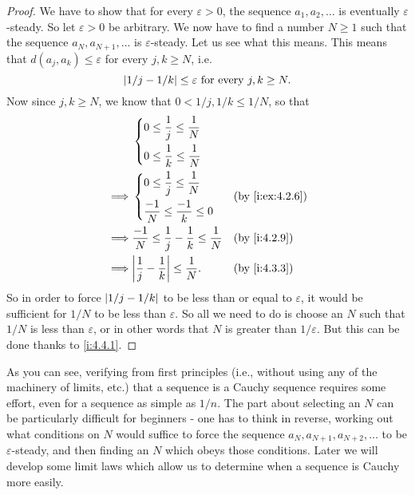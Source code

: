 \begin{proof}
  We have to show that for every \(\varepsilon > 0\), the sequence \(a_1, a_2, \dots\) is eventually \(\varepsilon\)-steady.
  So let \(\varepsilon > 0\) be arbitrary.
  We now have to find a number \(N \geq 1\) such that the sequence \(a_N, a_{N + 1}, \dots\) is \(\varepsilon\)-steady.
  Let us see what this means.
  This means that \(d(a_j, a_k) \leq \varepsilon\) for every \(j, k \geq N\), i.e.
  \[
    \left\lvert1 / j - 1 / k\right\rvert \leq \varepsilon \text{ for every } j, k \geq N.
  \]
  Now since \(j, k \geq N\), we know that \(0 < 1 / j, 1 / k \leq 1 / N\), so that
  \begin{align*}
             &
    \begin{dcases}
      0 \leq \dfrac{1}{j} \leq \dfrac{1}{N} \\
      0 \leq \dfrac{1}{k} \leq \dfrac{1}{N} \\
    \end{dcases}
    \\
    \implies &
    \begin{dcases}
      0 \leq \dfrac{1}{j} \leq \dfrac{1}{N}   \\
      \dfrac{-1}{N} \leq \dfrac{-1}{k} \leq 0 \\
    \end{dcases}
             &                                                                  & \by{i:ex:4.2.6}                \\
    \implies & \dfrac{-1}{N} \leq \dfrac{1}{j} - \dfrac{1}{k} \leq \dfrac{1}{N} &                 & \by{i:4.2.9} \\
    \implies & \abs{\dfrac{1}{j} - \dfrac{1}{k}} \leq \dfrac{1}{N}.             &                 & \by{i:4.3.3}
  \end{align*}
  So in order to force \(\left\lvert1 / j - 1 / k\right\rvert\) to be less than or equal to \(\varepsilon\), it would be sufficient for \(1 / N\) to be less than \(\varepsilon\).
  So all we need to do is choose an \(N\) such that \(1 / N\) is less than \(\varepsilon\), or in other words that \(N\) is greater than \(1 / \varepsilon\).
  But this can be done thanks to \cref{i:4.4.1}.
\end{proof}

\begin{note}
  As you can see, verifying from first principles (i.e., without using any of the machinery of limits, etc.) that a sequence is a Cauchy sequence requires some effort, even for a sequence as simple as \(1 / n\).
  The part about selecting an \(N\) can be particularly difficult for beginners
  - one has to think in reverse, working out what conditions on \(N\) would suffice to force the sequence \(a_N, a_{N + 1}, a_{N + 2}, \dots\) to be \(\varepsilon\)-steady, and then finding an \(N\) which obeys those conditions.
  Later we will develop some limit laws which allow us to determine when a sequence is Cauchy more easily.
\end{note}

